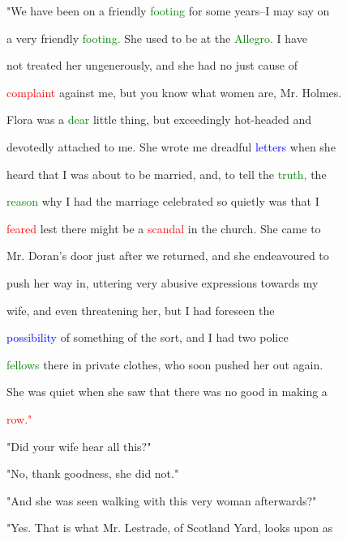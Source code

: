  "We have been on a \textcolor{BurntOrange}{friendly} \textcolor{green}{footing} for some years--I may say on

 a very \textcolor{BurntOrange}{friendly} \textcolor{green}{footing.} She used to be at the \textcolor{green}{Allegro.} I have

 not \textcolor{BurntOrange}{treated} her ungenerously, and she had no just cause of

 \textcolor{red}{complaint} against me, but you know what women are, Mr. Holmes.

 Flora was a \textcolor{green}{dear} little thing, but exceedingly hot-headed and

 devotedly attached to me. She wrote me \textcolor{BurntOrange}{dreadful} \textcolor{blue}{letters} when she

 heard that I was about to be married, and, to tell the \textcolor{green}{truth,} the

 \textcolor{green}{reason} why I had the \textcolor{BurntOrange}{marriage} celebrated so quietly was that I

 \textcolor{red}{feared} lest there might be a \textcolor{red}{scandal} in the \textcolor{BurntOrange}{church.} She came to

 Mr. Doran's door just after we returned, and she endeavoured to

 push her way in, uttering very abusive expressions towards my

 wife, and even \textcolor{BurntOrange}{threatening} her, but I had \textcolor{BurntOrange}{foreseen} the

 \textcolor{blue}{possibility} of something of the sort, and I had two \textcolor{BurntOrange}{police}

 \textcolor{green}{fellows} there in private clothes, who soon pushed her out again.

 She was \textcolor{BurntOrange}{quiet} when she saw that there was no \textcolor{BurntOrange}{good} in making a

 \textcolor{red}{row."}



 "Did your wife hear all this?"



 "No, thank \textcolor{BurntOrange}{goodness,} she did not."



 "And she was seen walking with this very woman afterwards?"



 "Yes. That is what Mr. Lestrade, of Scotland Yard, looks upon as

